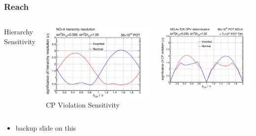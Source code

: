 \documentclass[10pt,professionalfonts,xcolor=table]{beamer}
\begin{document}
\begin{frame}
\frametitle{\nova Reach}
\begin{columns}[c]
\centering
\textcolor{custom_red}{Hierarchy Sensitivity}

\includegraphics[width=\textwidth]{figures/plots/nova/hie_sens.pdf}
\centering
\textcolor{custom_red}{CP Violation Sensitivity}

\includegraphics[width=\textwidth]{figures/plots/nova/cpv_sens_t2k.pdf}

\end{columns}
\begin{itemize}
\item backup slide on this
\end{itemize}
\end{frame}
\end{document}
